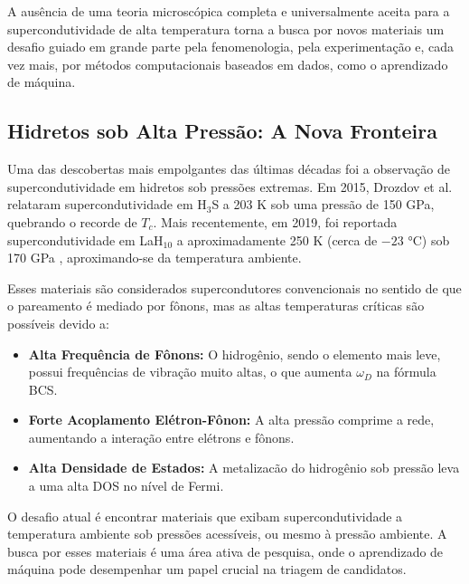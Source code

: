 \documentclass[12pt, a4paper, oneside]{report}
\begin{document}
A ausência de uma teoria microscópica completa e universalmente aceita para a supercondutividade de alta temperatura torna a busca por novos materiais um desafio guiado em grande parte pela fenomenologia, pela experimentação e, cada vez mais, por métodos computacionais baseados em dados, como o aprendizado de máquina.

\subsection{Hidretos sob Alta Pressão: A Nova Fronteira}

Uma das descobertas mais empolgantes das últimas décadas foi a observação de supercondutividade em hidretos sob pressões extremas. Em 2015, Drozdov et al. \cite{drozdov2015} relataram supercondutividade em H$_3$S a 203 K sob uma pressão de 150 GPa, quebrando o recorde de $T_c$. Mais recentemente, em 2019, foi reportada supercondutividade em LaH$_{10}$ a aproximadamente 250 K (cerca de $-23$ °C) sob 170 GPa \cite{drozdov2019}, aproximando-se da temperatura ambiente.

Esses materiais são considerados supercondutores convencionais no sentido de que o pareamento é mediado por fônons, mas as altas temperaturas críticas são possíveis devido a:

\begin{itemize}
    \item \textbf{Alta Frequência de Fônons:} O hidrogênio, sendo o elemento mais leve, possui frequências de vibração muito altas, o que aumenta $\omega_D$ na fórmula BCS.
    \item \textbf{Forte Acoplamento Elétron-Fônon:} A alta pressão comprime a rede, aumentando a interação entre elétrons e fônons.
    \item \textbf{Alta Densidade de Estados:} A metalizacão do hidrogênio sob pressão leva a uma alta DOS no nível de Fermi.
\end{itemize}

O desafio atual é encontrar materiais que exibam supercondutividade a temperatura ambiente sob pressões acessíveis, ou mesmo à pressão ambiente. A busca por esses materiais é uma área ativa de pesquisa, onde o aprendizado de máquina pode desempenhar um papel crucial na triagem de candidatos.



\end{document}
